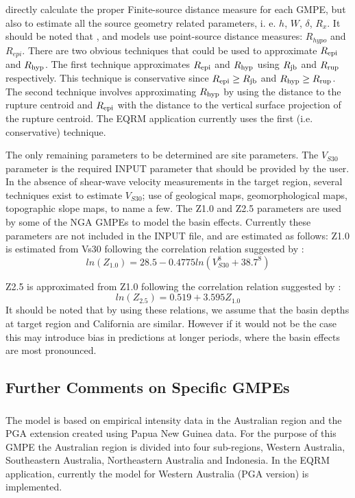 directly calculate the proper Finite-source distance measure for
each GMPE, but also to estimate all the source geometry related
parameters, i. e. $h$, $W$, $\delta$, $R_x$. It should be noted that
\citet{eqrm_Gaull90a}, and \citet{eqrm_Liang08} models use
point-source distance measures: $R_{hypo}$ and $R_{epi}$. There are
two obvious techniques that could be used to approximate $\Repi$ and
$\Rhyp$. The first technique approximates $\Repi$ and $\Rhyp$ using
$\Rjb$ and $\Rrup$ respectively. This technique is conservative
since \mbox{$\Repi \geq \Rjb$} and \mbox{$\Rhyp \geq \Rrup$}. The
second technique involves approximating $\Rhyp$ by using the
distance to the rupture centroid and $\Repi$ with the distance to
the vertical surface projection of the rupture centroid. The EQRM
application currently uses the first (i.e. conservative) technique.

The only remaining parameters to be determined are site parameters.
The $V_{S30}$ parameter is the required INPUT parameter that should
be provided by the user. In the absence of shear-wave velocity
measurements in the target region, several techniques exist to
estimate $V_{S30}$; use of geological maps, geomorphological maps,
topographic slope maps, to name a few. The Z1.0 and Z2.5 parameters
are used by some of the NGA GMPEs to model the basin effects.
Currently these parameters are not included in the INPUT file, and
are estimated as follows: Z1.0 is estimated from Vs30 following the
correlation relation suggested by \citet{eqrm_Chiou08}:
\begin{equation}
ln(Z_{1.0}) = 28.5-0.4775ln(V_{S30}^8+38.7^8)
\end{equation}

Z2.5 is approximated from Z1.0 following the correlation relation
suggested by \citet{eqrm_Campbell07}:
\begin{equation}
ln(Z_{2.5}) = 0.519+3.595Z_{1.0}
\end{equation}
It should be noted that by using these relations, we assume that the
basin depths at target region and California are similar. However if
it would not be the case this may introduce bias in predictions at
longer periods, where the basin effects are most pronounced.

\subsection{Further Comments on Specific GMPEs}

\subsubsection{\citet{eqrm_Gaull90a}}
The \citet{eqrm_Gaull90a} model is based on empirical intensity data
in the Australian region and the PGA extension created using Papua
New Guinea data. For the purpose of this GMPE the Australian region
is divided into four sub-regions, Western Australia, Southeastern
Australia, Northeastern Australia and Indonesia. In the EQRM
application, currently the model for Western Australia (PGA version)
is implemented.


